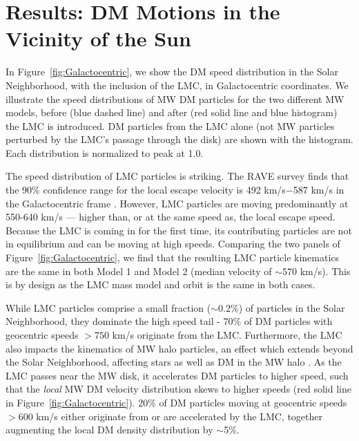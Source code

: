 \documentclass[letterpaper,11pt]{article}
\begin{document}
\section{Results: DM Motions in the Vicinity of the Sun}
\label{sec:results}



In Figure~\ref{fig:Galactocentric}, we show the DM speed distribution in the Solar Neighborhood, with the inclusion of the LMC, in Galactocentric coordinates.  We illustrate the speed distributions of MW DM particles for the two different MW models, 
before (blue dashed line) and after (red solid line and 
blue histogram) the 
LMC is introduced. DM particles from the LMC alone (not MW particles perturbed by the LMC's passage through the disk) are shown with the histogram. Each distribution is normalized to peak at 1.0. 


The speed distribution of LMC particles is striking. The RAVE survey finds that the 90\% confidence range for the local escape 
velocity is 492 km/s$-$587 km/s in the Galactocentric frame \cite{Piffl2014}. However, 
LMC particles are moving predominantly at 550-640 km/s --- higher than, or at the same speed as, the
local escape speed.
Because the LMC is coming in for the first time, its contributing particles are not 
in equilibrium and can be moving at high speeds. Comparing the two panels of Figure~\ref{fig:Galactocentric}, we find that the resulting LMC particle kinematics are the 
same in both Model 1 and Model 2 (median velocity of $\sim$570 km/s). This 
is by design as the LMC mass model and orbit is the same in both cases.


While LMC particles comprise a small fraction ($\sim$0.2\%) of particles in the Solar Neighborhood,
they dominate the high speed tail - 70\% of DM particles with geocentric speeds $>750$ km/s originate from the LMC.
Furthermore, the LMC also impacts the kinematics of MW halo particles, an effect which extends beyond the Solar Neighborhood, affecting stars as well as DM in the MW halo \cite{G19}.
As the LMC passes near the MW disk, it accelerates DM particles to higher speed, such that the {\it local} MW DM velocity distribution 
skews to higher speeds (red solid line in Figure~\ref{fig:Galactocentric}). 20\% of DM particles moving 
at geocentric speeds $>600$ km/s either originate from or are accelerated by the LMC, together 
augmenting the local DM density distribution by $\sim$5\%.
\end{document}
